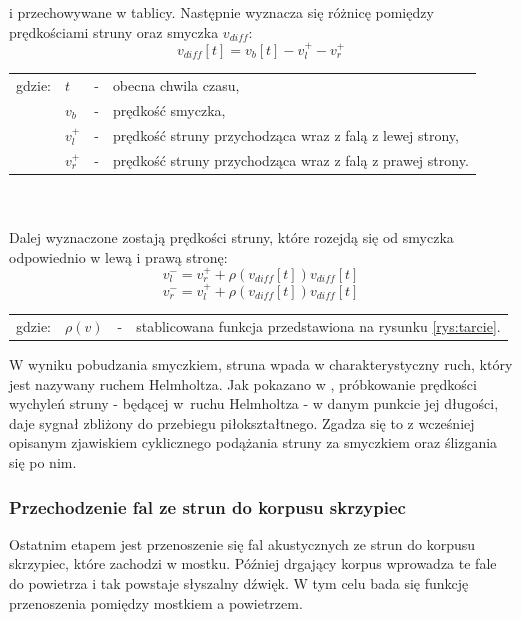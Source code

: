 i przechowywane w tablicy. Następnie wyznacza się różnicę pomiędzy prędkościami struny oraz smyczka $v_{diff}$:
\begin{equation} \label{equ:wzor1}
v_{diff}[t] = v_b[t] - v_{l}^{+} - v_{r}^{+}
\end{equation}
\begin{tabular}{ l l l l}
	gdzie: & $t$ &  - & obecna chwila czasu, \\
	&	$v_b$ & - &  prędkość smyczka, \\
	&	$v_{l}^{+}$ & - & prędkość struny przychodząca wraz z falą z lewej strony,\\
	&	$v_{r}^{+}$ & - &  prędkość struny przychodząca wraz z falą z prawej strony.\\
\end{tabular} \\ \\
Dalej wyznaczone zostają prędkości struny, które rozejdą się od smyczka odpowiednio w lewą i prawą stronę:
\begin{equation} \label{equ:wzor2}
v_{l}^{-} = v_r^{+} +  \rho(v_{diff}[t])v_{diff}[t]
\end{equation}
\begin{equation} \label{equ:wzor3}
v_{r}^{-} = v_l^{+} +  \rho(v_{diff}[t])v_{diff}[t]
\end{equation}
\begin{tabular}{ l l l l}
	gdzie: & $\rho(v)$ &  - & stablicowana funkcja przedstawiona na rysunku \ref{rys:tarcie}. \\
	
\end{tabular}
\vspace{6pt}

W wyniku pobudzania smyczkiem, struna wpada w charakterystyczny ruch, który jest nazywany ruchem Helmholtza. Jak pokazano w \cite{bowed_2}, próbkowanie prędkości wychyleń struny - będącej w~ruchu Helmholtza - w danym punkcie jej długości, daje sygnał zbliżony do przebiegu piłokształtnego. Zgadza się to z wcześniej opisanym zjawiskiem cyklicznego podążania struny za smyczkiem oraz ślizgania się po nim.

\subsubsection{Przechodzenie fal ze strun do korpusu skrzypiec}\label{sec:model_violinarma}

Ostatnim etapem jest przenoszenie się fal akustycznych ze strun do korpusu skrzypiec, które zachodzi w mostku. Później drgający korpus wprowadza te fale do powietrza i tak powstaje słyszalny dźwięk. W tym celu bada się funkcję przenoszenia pomiędzy mostkiem a powietrzem. 

